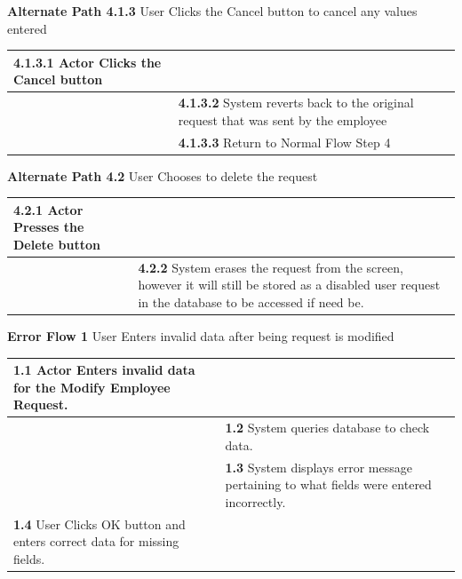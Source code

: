 \documentclass[letterpaper,12pt]{report}
\begin{document}
{\centering \textbf{Alternate Path 4.1.3}
\linebreak User Clicks the Cancel button to cancel any values entered
\begin{center}
\xuchead
\begin{tabular}{| p{8.5cm} | p{8.5cm} |}
\hline
\textbf{4.1.3.1} Actor\index{actor} Clicks the Cancel button & \\
\hline
& \textbf{4.1.3.2} System\index{system} reverts back to the original request that was sent by the employee \\
\hline
& \textbf{4.1.3.3} Return to Normal Flow Step 4 \\
\hline
\end{tabular}
\end{center}

\centering \textbf{Alternate Path 4.2}
\linebreak User Chooses to delete the request
\begin{center}
\xuchead
\begin{tabular}{| p{8.5cm} | p{8.5cm} |}
\hline
\textbf{4.2.1} \index{actor}Actor Presses the Delete button & \\
\hline
& \textbf{4.2.2} System\index{system} erases the request from the screen, however it will still be stored as a disabled user request in the database\index{Database} to be accessed if need be. \\
\hline
\end{tabular}
\end{center}
\pagebreak
\centering \textbf{Error Flow 1}
\linebreak User Enters invalid data after being request is modified
\begin{center}
\xuchead
\begin{tabular}{| p{8.5cm} | p{8.5cm} |}
\hline
\textbf{1.1} \index{actor}Actor Enters invalid data for the Modify Employee Request. & \\
\hline
& \textbf{1.2} System\index{system} queries database\index{Database} to check data. \\
\hline
& \textbf{1.3} System displays error message pertaining to what fields were entered incorrectly. \\
\hline
\textbf{1.4} User Clicks OK button and enters correct data for missing fields. & \\
\hline
\end{tabular}
\end{center}
\pagebreak
}
\end{document}
